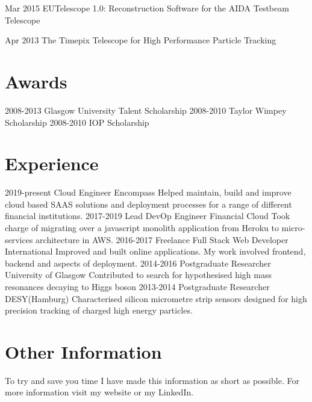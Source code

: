 \documentclass[]{twentysecondcv}
\begin{document}
\begin{twentyshort}
  \twentyitemshort
    {Mar 2015}
    {EUTelescope 1.0: Reconstruction Software for the AIDA Testbeam Telescope}
\end{twentyshort}

\begin{twentyshort}
  \twentyitemshort
    {Apr 2013}
    {The Timepix Telescope for High Performance Particle Tracking}
\end{twentyshort}



\section*{Awards}

\begin{twentyshort}
  \twentyitemshort
    {2008-2013}
    {Glasgow University Talent Scholarship}
  \twentyitemshort
    {2008-2010}
    {Taylor Wimpey Scholarship}
  \twentyitemshort
    {2008-2010}
    {IOP Scholarship}
\end{twentyshort}


\section*{Experience}

\begin{twenty}
  \twentyitem
  {2019-present}
  {Cloud Engineer}
  {Encompass}
  {Helped maintain, build and improve cloud based SAAS solutions and deployment processes for a range of different financial institutions.}
  \twentyitem
  {2017-2019}
  {Lead DevOp Engineer}
  {Financial Cloud}
  {Took charge of migrating over a javascript monolith application from Heroku to micro-services architecture in AWS.}
  \twentyitem
    {2016-2017}
    {Freelance Full Stack Web Developer}
    {International}
    {Improved and built online applications. My work involved frontend, backend and aspects of deployment.}
  \twentyitem
    {2014-2016}
    {Postgraduate Researcher}
    {University of Glasgow}
    {Contributed to search for hypothesised high mass resonances decaying to Higgs boson}
\twentyitem
    {2013-2014}
    {Postgraduate Researcher}
		{DESY(Hamburg)}
    {Characterised silicon micrometre strip sensors designed for high precision tracking of charged high energy particles.}

\end{twenty}
\section*{Other Information}
\hspace*{5pt}
To try and save you time I have made this information as short as possible. For more information visit my website or my LinkedIn.
\hspace*{5pt}
\vspace*{2pt}

\end{document}
